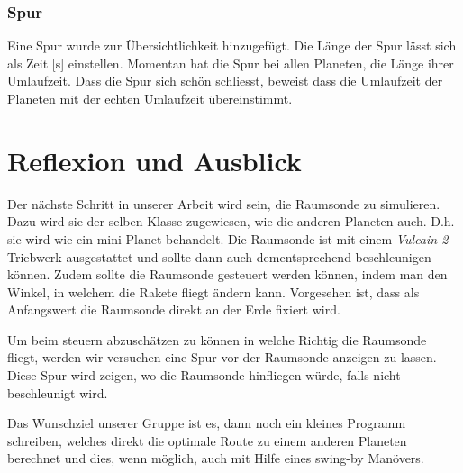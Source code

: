 \documentclass{article}
\begin{document}
\subsubsection{Spur}
Eine Spur wurde zur Übersichtlichkeit hinzugefügt. Die Länge der Spur lässt sich als Zeit [s] einstellen. Momentan hat die Spur bei allen Planeten, die Länge ihrer Umlaufzeit. Dass die Spur sich schön schliesst, beweist dass die Umlaufzeit der Planeten mit der echten Umlaufzeit übereinstimmt.


\section{Reflexion und Ausblick}
Der nächste Schritt in unserer Arbeit wird sein, die Raumsonde zu simulieren. Dazu wird sie der selben Klasse zugewiesen, wie die anderen Planeten auch. D.h. sie wird wie ein mini Planet behandelt. Die Raumsonde ist mit einem \textit{Vulcain 2} Triebwerk ausgestattet und sollte dann auch dementsprechend beschleunigen können. Zudem sollte die Raumsonde gesteuert werden können, indem man den Winkel, in welchem die Rakete fliegt ändern kann. Vorgesehen ist, dass als Anfangswert die Raumsonde direkt an der Erde fixiert wird. 

Um beim steuern abzuschätzen zu können in welche Richtig die Raumsonde fliegt, werden wir versuchen eine Spur vor der Raumsonde anzeigen zu lassen. Diese Spur wird zeigen, wo die Raumsonde hinfliegen würde, falls nicht beschleunigt wird.

Das Wunschziel unserer Gruppe ist es, dann noch ein kleines Programm schreiben, welches direkt die optimale Route zu einem anderen Planeten berechnet und dies, wenn möglich, auch mit Hilfe eines swing-by Manövers.
\end{document}
